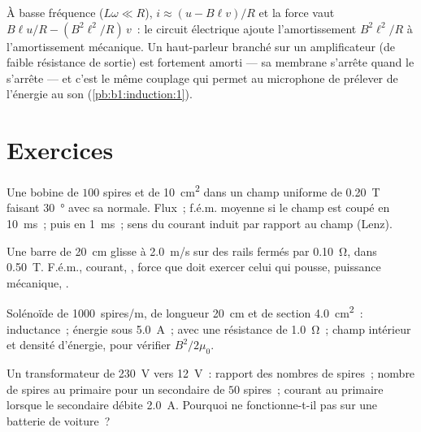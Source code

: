 \begin{remark}\label{rem:b1:induction:damping}
À basse fréquence ($L\omega \ll R$), $i \approx (u - B\ell v)/R$ et la force
vaut $B\ell u/R - (B^2\ell^2/R)\,v$~: le circuit électrique ajoute
l'amortissement $B^2\ell^2/R$ à l'amortissement mécanique. Un haut-parleur
branché sur un amplificateur (de faible résistance de sortie) est fortement
amorti --- sa membrane s'arrête quand le  s'arrête --- et c'est le même
couplage qui permet au microphone de prélever de l'énergie au son
(\cref{pb:b1:induction:1}).
\end{remark}

\section{Exercices}

\begin{exercise}[$\star$]\label{exo:b1:induction:1}
Une bobine de $100$ spires et de \qty{10}{cm^2} dans un champ uniforme de
\qty{0.20}{T} faisant \qty{30}{\degree} avec sa normale. Flux~; f.é.m. moyenne
si le champ est coupé en \qty{10}{ms}~; puis en \qty{1}{ms}~; sens du courant
induit par rapport au champ (Lenz).
\end{exercise}

\begin{exercise}[$\star$]\label{exo:b1:induction:2}
Une barre de \qty{20}{cm} glisse à \qty{2.0}{m/s} sur des rails fermés par
\qty{0.10}{\ohm}, dans \qty{0.50}{T}. F.é.m., courant, , force
que doit exercer celui qui pousse, puissance mécanique, .
\end{exercise}

\begin{exercise}[$\star$]\label{exo:b1:induction:3}
Solénoïde de \qty{1000}{spires/m}, de longueur \qty{20}{cm} et de section \qty{4.0}{cm^2}~:
inductance~; énergie sous \qty{5.0}{A}~;  avec une résistance
de \qty{1.0}{\ohm}~; champ intérieur et densité d'énergie, pour vérifier $B^2/2\mu_0$.
\end{exercise}

\begin{exercise}[$\star$]\label{exo:b1:induction:4}
Un transformateur de \qty{230}{V} vers \qty{12}{V}~: rapport des nombres de
spires~; nombre de spires au primaire pour un secondaire de $50$ spires~;
courant au primaire lorsque le secondaire débite \qty{2.0}{A}. Pourquoi ne
fonctionne-t-il pas sur une batterie de voiture~?
\end{exercise}

